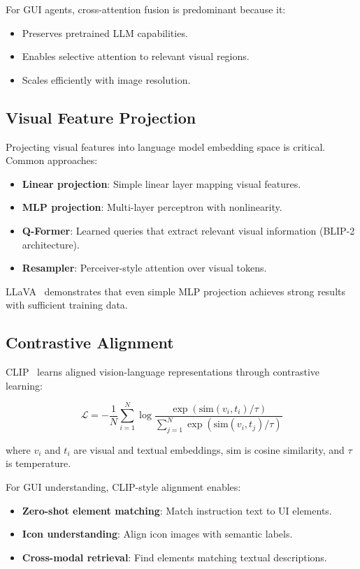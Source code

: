 \documentclass[11pt]{article}
\begin{document}
For GUI agents, cross-attention fusion is predominant because it:

\begin{itemize}
    \item Preserves pretrained LLM capabilities.
    \item Enables selective attention to relevant visual regions.
    \item Scales efficiently with image resolution.
\end{itemize}

\subsection{Visual Feature Projection}

Projecting visual features into language model embedding space is critical. Common approaches:

\begin{itemize}
    \item \textbf{Linear projection}: Simple linear layer mapping visual features.
    \item \textbf{MLP projection}: Multi-layer perceptron with nonlinearity.
    \item \textbf{Q-Former}: Learned queries that extract relevant visual information (BLIP-2 architecture).
    \item \textbf{Resampler}: Perceiver-style attention over visual tokens.
\end{itemize}

LLaVA~\cite{llava2023} demonstrates that even simple MLP projection achieves strong results with sufficient training data.

\subsection{Contrastive Alignment}

CLIP~\cite{clip2021} learns aligned vision-language representations through contrastive learning:

$$\mathcal{L} = -\frac{1}{N}\sum_{i=1}^{N}\log\frac{\exp(\text{sim}(v_i, t_i)/\tau)}{\sum_{j=1}^{N}\exp(\text{sim}(v_i, t_j)/\tau)}$$

where $v_i$ and $t_i$ are visual and textual embeddings, $\text{sim}$ is cosine similarity, and $\tau$ is temperature.

For GUI understanding, CLIP-style alignment enables:

\begin{itemize}
    \item \textbf{Zero-shot element matching}: Match instruction text to UI elements.
    \item \textbf{Icon understanding}: Align icon images with semantic labels.
    \item \textbf{Cross-modal retrieval}: Find elements matching textual descriptions.
\end{itemize}
\end{document}
